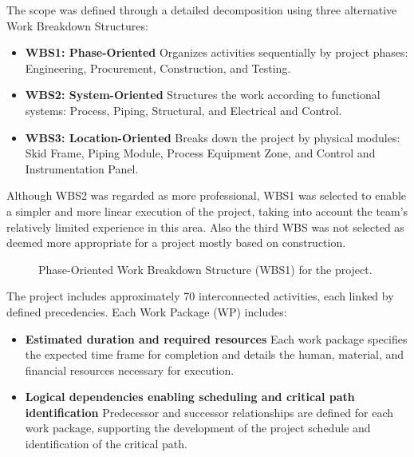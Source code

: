The scope was defined through a detailed decomposition using three alternative Work Breakdown Structures:
\begin{itemize}
    \item \textbf{WBS1: Phase-Oriented}
          Organizes activities sequentially by project phases: Engineering, Procurement, Construction, and Testing.
    \item \textbf{WBS2: System-Oriented}
          Structures the work according to functional systems: Process, Piping, Structural, and Electrical and Control.
    \item \textbf{WBS3: Location-Oriented}
          Breaks down the project by physical modules: Skid Frame, Piping Module, Process Equipment Zone, and Control and Instrumentation Panel.
\end{itemize}
Although WBS2 \cite{WBSAlternative1} was regarded as more professional, WBS1 was selected to enable a simpler and more linear execution of the project, taking into account the team’s relatively limited experience in this area.
Also the third WBS \cite{WBSAlternative2} was not selected as deemed more appropriate for a project mostly based on construction.

\begin{figure}[p]
    \centering
    \caption{Phase-Oriented Work Breakdown Structure (WBS1) for the project.}
    \label{fig:wbs1}
\end{figure}

The project includes approximately 70 interconnected activities, each linked by defined precedencies.
Each Work Package (WP) includes:
\begin{itemize}
    \item \textbf{Estimated duration and required resources}
          Each work package specifies the expected time frame for completion and details the human, material, and financial resources necessary for execution.
    \item \textbf{Logical dependencies enabling scheduling and critical path identification}
          Predecessor and successor relationships are defined for each work package, supporting the development of the project schedule and identification of the critical path.
\end{itemize}

